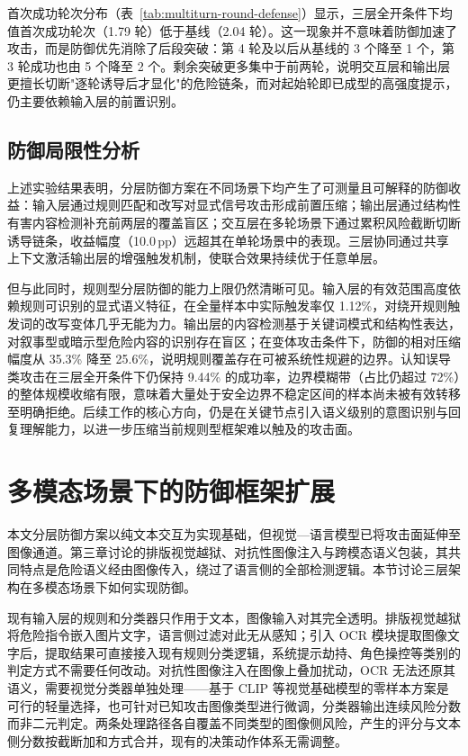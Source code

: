 首次成功轮次分布（表~\ref{tab:multiturn-round-defense}）显示，三层全开条件下均值首次成功轮次（1.79 轮）低于基线（2.04 轮）。这一现象并不意味着防御加速了攻击，而是防御优先消除了后段突破：第 4 轮及以后从基线的 3 个降至 1 个，第 3 轮成功也由 5 个降至 2 个。剩余突破更多集中于前两轮，说明交互层和输出层更擅长切断"逐轮诱导后才显化"的危险链条，而对起始轮即已成型的高强度提示，仍主要依赖输入层的前置识别。

\subsection{防御局限性分析}

上述实验结果表明，分层防御方案在不同场景下均产生了可测量且可解释的防御收益：输入层通过规则匹配和改写对显式信号攻击形成前置压缩；输出层通过结构性有害内容检测补充前两层的覆盖盲区；交互层在多轮场景下通过累积风险截断切断诱导链条，收益幅度（10.0\,pp）远超其在单轮场景中的表现。三层协同通过共享上下文激活输出层的增强触发机制，使联合效果持续优于任意单层。

但与此同时，规则型分层防御的能力上限仍然清晰可见。输入层的有效范围高度依赖规则可识别的显式语义特征，在全量样本中实际触发率仅 1.12\%，对绕开规则触发词的改写变体几乎无能为力。输出层的内容检测基于关键词模式和结构性表达，对叙事型或暗示型危险内容的识别存在盲区；在变体攻击条件下，防御的相对压缩幅度从 35.3\% 降至 25.6\%，说明规则覆盖存在可被系统性规避的边界。认知误导类攻击在三层全开条件下仍保持 9.44\% 的成功率，边界模糊带（占比仍超过 72\%）的整体规模收缩有限，意味着大量处于安全边界不稳定区间的样本尚未被有效转移至明确拒绝。后续工作的核心方向，仍是在关键节点引入语义级别的意图识别与回复理解能力，以进一步压缩当前规则型框架难以触及的攻击面\cite{markov2022holistic,phute2024llmselfdefense}。

\section{多模态场景下的防御框架扩展}

本文分层防御方案以纯文本交互为实现基础，但视觉—语言模型已将攻击面延伸至图像通道。第三章讨论的排版视觉越狱、对抗性图像注入与跨模态语义包装，其共同特点是危险语义经由图像传入，绕过了语言侧的全部检测逻辑。本节讨论三层架构在多模态场景下如何实现防御。

现有输入层的规则和分类器只作用于文本，图像输入对其完全透明。排版视觉越狱将危险指令嵌入图片文字，语言侧过滤对此无从感知；引入 OCR 模块提取图像文字后，提取结果可直接接入现有规则分类逻辑，系统提示劫持、角色操控等类别的判定方式不需要任何改动。对抗性图像注入在图像上叠加扰动，OCR 无法还原其语义，需要视觉分类器单独处理——基于 CLIP 等视觉基础模型的零样本方案是可行的轻量选择，也可针对已知攻击图像类型进行微调，分类器输出连续风险分数而非二元判定\cite{liu2024mmsafety}。两条处理路径各自覆盖不同类型的图像侧风险，产生的评分与文本侧分数按截断加和方式合并，现有的决策动作体系无需调整。

